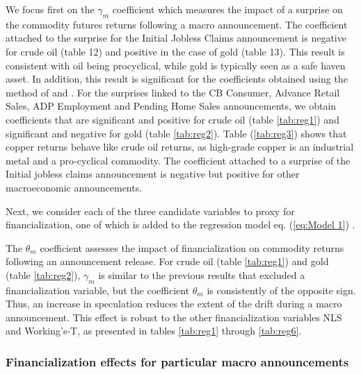 \documentclass[12pt]{article}
\begin{document}
We focus first on the $\gamma_m$ coefficient which measures the impact of a surprise on the commodity futures returns following a macro announcement. The coefficient attached to the surprise for the Initial Jobless Claims announcement is negative for crude oil (table 12) and positive in the case of gold (table 13). This result is consistent with oil being procyclical, while gold is typically seen as a safe haven asset.  In addition, this result is significant for the coefficients obtained using the method of \citet{kurov2019price} and \citet{andersen2007real}. For the surprises linked to the CB Consumer, Advance Retail Sales, ADP Employment and Pending Home Sales announcements, we obtain coefficients that are significant and positive for crude oil (table \ref{tab:reg1}) and significant and negative for gold (table \ref{tab:reg2}). Table (\ref{tab:reg3})  shows that copper returns behave like crude oil returns, as high-grade copper is an industrial metal and a pro-cyclical commodity. The coefficient attached to a surprise of the Initial jobless claims announcement is negative but positive for other macroeconomic announcements. 

Next, we consider each of the three candidate variables to proxy for financialization, one of which is added to the regression model eq. (\ref{eq:Model 1}) . 

The $\theta_m$ coefficient assesses the impact of financialization on commodity returns following an announcement release. For crude oil (table \ref{tab:reg1}) and gold (table \ref{tab:reg2}),  $\gamma_m$ is similar to the previous results that excluded a financialization variable, but the coefficient $\theta_m$ is consistently of the opposite sign.  Thus, an increase in speculation reduces the extent of the drift during a macro  announcement. This effect is robust to the other financialization variables NLS and Working’s-T, as presented in tables \ref{tab:reg1} through \ref{tab:reg6}.

\subsubsection{Financialization effects for particular macro announcements}
\end{document}
